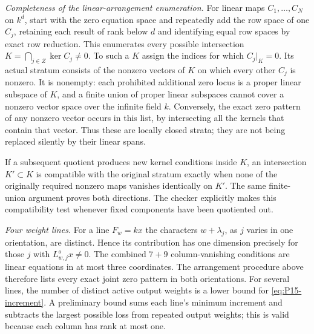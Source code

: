 \emph{Completeness of the linear-arrangement enumeration.}
For linear maps $C_1,\ldots,C_N$ on $k^d$, start with the zero equation
space and repeatedly add the row space of one $C_j$, retaining each
result of rank below $d$ and identifying equal row spaces by exact
row reduction.  This enumerates every possible intersection
$K=\bigcap_{j\in Z}\ker C_j\ne0$.
To such a $K$ assign the indices for which $C_j|_K=0$.
Its actual stratum consists of the nonzero vectors of $K$ on which every
other $C_j$ is nonzero.  It is nonempty: each prohibited additional zero
locus is a proper linear subspace of $K$, and a finite union of proper
linear subspaces cannot cover a nonzero vector space over the infinite
field $k$.
Conversely, the exact zero pattern of any nonzero vector occurs in this
list, by intersecting all the kernels that contain that vector.  Thus
these are locally closed strata; they are not being replaced silently
by their linear spans.

If a subsequent quotient produces new kernel conditions inside $K$, an
intersection $K'\subset K$ is compatible with the original stratum
exactly when none of the originally required nonzero maps vanishes
identically on $K'$.  The same finite-union argument proves both directions.
The checker explicitly makes this compatibility test whenever fixed
components have been quotiented out.

\emph{Four weight lines.}
For a line $F_w=kx$ the characters $w+\lambda_j$, as $j$ varies in one
orientation, are distinct.  Hence its contribution has one dimension
precisely for those $j$ with $L^o_{w,j}x\ne0$.
The combined $7+9$ column-vanishing conditions are linear equations in
at most three coordinates.  The arrangement procedure above therefore
lists every exact joint zero pattern in both orientations.
For several lines, the number of distinct active output weights is a
lower bound for \eqref{eq:P15-increment}.
A preliminary bound sums each line's minimum increment and subtracts
the largest possible loss from repeated output weights; this is valid
because each column has rank at most one.

